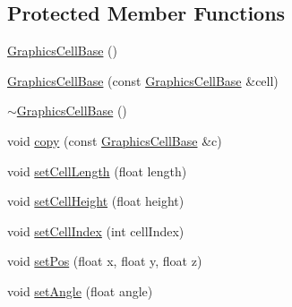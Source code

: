 \subsection*{\-Protected \-Member \-Functions}
\begin{DoxyCompactItemize}
\item 
\hyperlink{class_graphics_cell_base_ab21c2ad274f163b192f0fc90317e71ce}{\-Graphics\-Cell\-Base} ()
\item 
\hyperlink{class_graphics_cell_base_a26ae84e6182edb34d86f82a31b01bf5c}{\-Graphics\-Cell\-Base} (const \hyperlink{class_graphics_cell_base}{\-Graphics\-Cell\-Base} \&cell)
\item 
\hyperlink{class_graphics_cell_base_a8ed7c2070beab9a56286df8dd8b36f12}{$\sim$\-Graphics\-Cell\-Base} ()
\item 
void \hyperlink{class_graphics_cell_base_a5f252a083de2b8d9a6ab3e38cd187c15}{copy} (const \hyperlink{class_graphics_cell_base}{\-Graphics\-Cell\-Base} \&c)
\item 
void \hyperlink{class_graphics_cell_base_a3a7ec63edecc54916e2770f233f97bc8}{set\-Cell\-Length} (float length)
\item 
void \hyperlink{class_graphics_cell_base_a78cfe59851d680ee459449dbd8befef7}{set\-Cell\-Height} (float height)
\item 
void \hyperlink{class_graphics_cell_base_a1bd5925a454cd3926652de53ce584f68}{set\-Cell\-Index} (int cell\-Index)
\item 
void \hyperlink{class_graphics_cell_base_a1b73509c13e0021bc01f28b481b3c649}{set\-Pos} (float x, float y, float z)
\item 
void \hyperlink{class_graphics_cell_base_aa23fb4905505dbd30f7f1a770a3a4e56}{set\-Angle} (float angle)
\end{DoxyCompactItemize}
